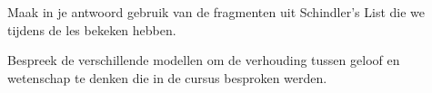 \documentclass[main.tex]{subfiles}
\begin{document}
\begin{examenvraag}
    \begin{vraag}
        Maak in je antwoord gebruik van de fragmenten uit Schindler’s List die we tijdens de les bekeken hebben.
    \end{vraag}

    \begin{antwoord}
    \end{antwoord}
\end{examenvraag}


\begin{examenvraag}
    \begin{vraag}
        Bespreek de verschillende modellen om de verhouding tussen geloof en wetenschap te denken die in de cursus besproken werden.
    \end{vraag}

    \begin{antwoord}
    \end{antwoord}
\end{examenvraag}
\end{document}
